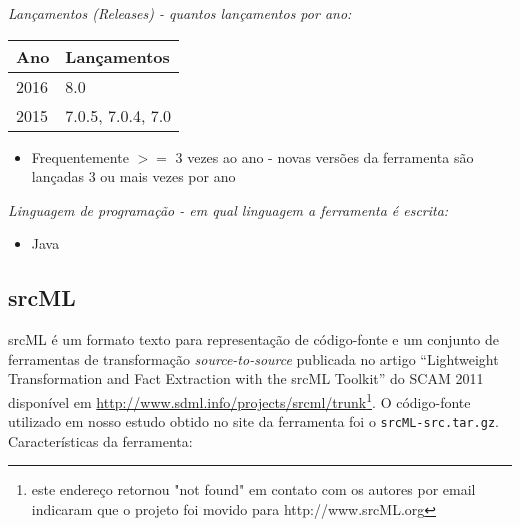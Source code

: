 \begin{description}

  \item {\it Lançamentos ({\it Releases}) - quantos lançamentos por ano:}
    \begin{table}[h!]
      \centering
      \begin{tabular}{| l | l |}
        \hline
        Ano  & Lançamentos       \\
        \hline
        2016 & 8.0               \\
        2015 & 7.0.5, 7.0.4, 7.0 \\
        \hline
      \end{tabular}
    \end{table}
    \begin{itemize}
      \item Frequentemente $>=$ 3 vezes ao ano - novas versões da ferramenta são lançadas 3 ou mais vezes por ano
    \end{itemize}

  \item {\it Linguagem de programação - em qual linguagem a ferramenta é escrita:}
    \begin{itemize}
      \item Java
    \end{itemize}

\end{description}

\subsection{srcML}

srcML é um formato texto para representação de código-fonte e um conjunto de
ferramentas de transformação {\it source-to-source} publicada no artigo
``Lightweight Transformation and Fact Extraction with the srcML Toolkit'' do
SCAM 2011 disponível em
\url{http://www.sdml.info/projects/srcml/trunk}\footnote{este endereço
retornou "not found" em contato com os autores por email indicaram que o
projeto foi movido para http://www.srcML.org}. O código-fonte utilizado em
nosso estudo obtido no site da ferramenta foi o \texttt{srcML-src.tar.gz}.
Características da ferramenta:

